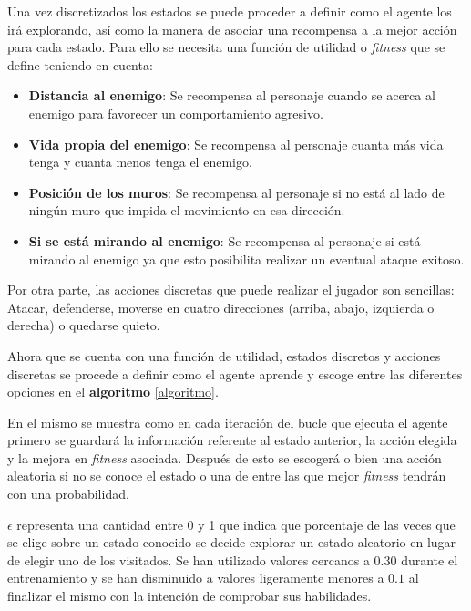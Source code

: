 Una vez discretizados los estados se puede proceder a definir como el agente los irá explorando, así como la manera de asociar una recompensa a la mejor acción para cada estado. Para ello se necesita una función de utilidad o \textit{fitness} que se define teniendo en cuenta:

\begin{itemize}
	\item \textbf{Distancia al enemigo}: Se recompensa al personaje cuando se acerca al enemigo para favorecer un comportamiento agresivo.
	\item \textbf{Vida propia del enemigo}: Se recompensa al personaje cuanta más vida tenga y cuanta menos tenga el enemigo.
	\item \textbf{Posición de los muros}: Se recompensa al personaje si no está al lado de ningún muro que impida el movimiento en esa dirección.
	\item \textbf{Si se está mirando al enemigo}: Se recompensa al personaje si está mirando al enemigo ya que esto posibilita realizar un eventual ataque exitoso.
\end{itemize}

\bigskip

Por otra parte, las acciones discretas que puede realizar el jugador son sencillas: Atacar, defenderse, moverse en cuatro direcciones (arriba, abajo, izquierda o derecha) o quedarse quieto.

\bigskip

Ahora que se cuenta con una función de utilidad, estados discretos y acciones discretas se procede a definir como el agente aprende y escoge entre las diferentes opciones en el \textbf{algoritmo} \ref{algoritmo}.

\bigskip


En el mismo se muestra como en cada iteración del bucle que ejecuta el agente primero se guardará la información referente al estado anterior, la acción elegida y la mejora en \textit{fitness} asociada. Después de esto se escogerá o bien una acción aleatoria si no se conoce el estado o una de entre las que mejor \textit{fitness} tendrán con una probabilidad.

\bigskip


\textbf{$\epsilon$} representa una cantidad entre 0 y 1 que indica que porcentaje de las veces que se elige sobre un estado conocido se decide explorar un estado aleatorio en lugar de  elegir uno de los visitados. Se han utilizado valores cercanos a $0.30$ durante el entrenamiento y se han disminuido a valores ligeramente menores a $0.1$ al finalizar el mismo con la intención de comprobar sus habilidades.


